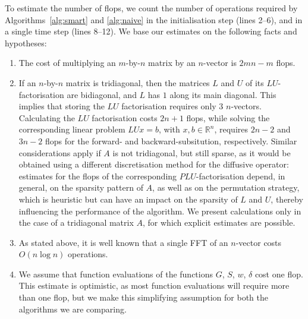 \documentclass[a4paper,final]{siamart190516}
\newcommand{\Rb}{\mathbb{R}}
\begin{document}
To estimate the number of flops, we count the number of operations required by
Algorithms~\ref{alg:smart} and \ref{alg:naive} in the initialisation step (lines 2--6), and
in a single time step (lines 8--12). We base our estimates on the following
facts and hypotheses:
\begin{enumerate}
  \item The cost of multiplying an $m$-by-$n$ matrix by an $n$-vector is $2mn - m$
    flops.
  \item If an $n$-by-$n$ matrix is tridiagonal, then the matrices $L$ and $U$ of its
    $LU$-factorisation are bidiagonal, and $L$ has $1$ along its main diagonal.
    This implies that storing the $LU$ factorisation requires only $3$
    $n$-vectors. Calculating the $LU$ factorisation costs $2n + 1$ flops, while
    solving the corresponding linear problem $LUx = b$, with $x,b \in \Rb^n$,
    requires $2n-2$ and $3n-2$ flops for the forward- and backward-subsitution,
    respectively. Similar considerations apply if $A$ is not tridiagonal, but still
    sparse, as it would be obtained using a different discretisation method for the
    diffusive operator: estimates for the flops of the corresponding
    $PLU$-factorisation depend, in general, on the sparsity pattern of $A$, as well
    as on the permutation strategy, which is heuristic but can have an impact on the
    sparsity of $L$ and $U$, thereby influencing the performance of the algorithm.
    We present calculations only in the case of a tridiagonal matrix $A$, for which
    explicit estimates are possible.

  \item As stated above, it is well known that a single FFT of an $n$-vector costs
    $O(n \log n)$ operations.

  \item We assume that function evaluations of the functions $G$, $S$, $w$, $\delta$
    cost one flop. This estimate is optimistic, as most function evaluations will
    require more than one flop, but we make this simplifying assumption for both the
    algorithms we are comparing.
\end{enumerate}
\end{document}

